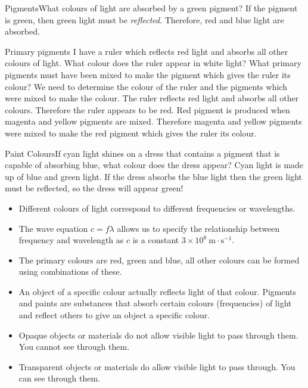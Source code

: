 \begin{wex}{Pigments}{What colours of light are absorbed by a green pigment?}
{If the pigment is green, then green light must be \textit{reflected}. Therefore, red and blue light are absorbed.}
\end{wex}

\begin{wex}{Primary pigments}
{I have a ruler which reflects red light and absorbs all other colours of light. What colour does the ruler appear in white light? What primary pigments must have been mixed to make the pigment which gives the ruler its colour? }
{
We need to determine the colour of the ruler and the pigments which were mixed to make the colour.
The ruler reflects red light and absorbs all other colours. Therefore the ruler appears to be red.
Red pigment is produced when magenta and yellow pigments are mixed. Therefore magenta and yellow pigments were mixed to make the red pigment which gives the ruler its colour.
}
\end{wex}

\begin{wex}{Paint Colours}{If cyan light shines on a dress that contains a pigment that is capable of absorbing blue, what colour does the dress appear?}
{
Cyan light is made up of blue and green light.
If the dress absorbs the blue light then the green light must be reflected, so the dress will appear green!}
\end{wex}


\begin{itemize}
\item Different colours of light correspond to different frequencies or wavelengths.
\item The wave equation $c=f\lambda$ allows us to specify the relationship between frequency and wavelength as $c$ is a constant $3\times10^8~\text{m}\cdot\text{s}^{-1}$.
\item The primary colours are red, green and blue, all other colours can be formed using combinations of these.
\item An object of a specific colour actually reflects light of that colour. Pigments and paints are substances that absorb certain colours (frequencies) of light and reflect others to give an object a specific colour.
\item Opaque objects or materials do not allow visible light to pass through them. You cannot see through them.
\item Transparent objects or materials do allow visible light to pass through. You can see through them.
\end{itemize}

